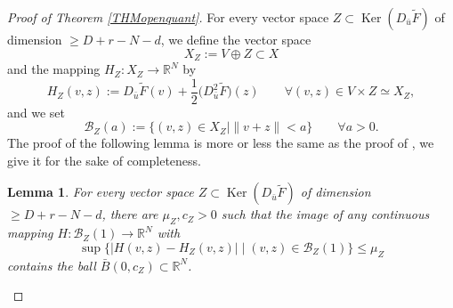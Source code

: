 \documentclass[JEP,XML,SOM,Unicode,NoFloatCountersInSection,published]{cedram}
\let\sep\mid
\DeclareMathOperator{\Ker}{Ker}
\newcommand\R{\mathbb R}
\newtheorem{lemma}[theorem]{Lemma}
\theoremstyle{definition}
\begin{document}
\begin{proof}[Proof of Theorem \ref{THMopenquant}]
For every vector space $Z\subset \Ker (D_{\bar{u}} \tilde{F})$ of dimension $\geq D+r-N-d$, we define the vector space
\[
X_Z := V \oplus Z \subset X
\]
and the mapping $H_Z : X_Z \to \R^N$
by
\[
H_Z(v,z) := D_{\bar{u}}\tilde{F} (v) + \frac{1}{2} \bigl(D^2_{\bar{u}} \tilde{F} \bigr) (z) \qquad \forall (v,z) \in V \times Z \simeq X_Z,
\]
and we set
\[
\mathcal{B}_Z (a) := \bigl\{ (v,z) \in X_Z \sep  \|v+z\| < a\bigr\} \qquad \forall a>0.
\]
The proof of the following lemma is more or less the same as the proof of \cite[Lem.\,B.7, p.\,135]{riffordbook}, we give it for the sake of completeness.

\begin{lemma}\label{LEM13jan}
For every vector space $Z\subset \Ker (D_{\bar{u}} \tilde{F})$ of dimension $\geq D+r-N-d$, there are $\mu_Z, c_Z>0$ such that the image of any continuous mapping $H : \mathcal{B}_Z(1) \to \R^N$ with
\begin{equation}\label{COND23july}
\sup \bigl\{ \left| H(v,z)-H_Z(v,z) \right| \sep  (v,z) \in \mathcal{B}_Z(1) \bigr\} \leq \mu_Z
\end{equation}
contains the ball $\bar{B}(0,c_Z)\subset \R^N$.
\end{lemma}


\end{proof}
\end{document}
